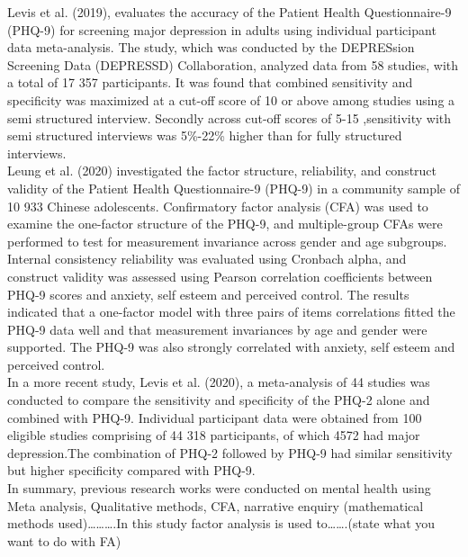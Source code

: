 \documentclass[12pt]{article}
\begin{document}
\noindent Levis et al. (2019), evaluates the accuracy of the Patient Health Questionnaire-9 (PHQ-9) for screening major depression in adults using individual participant data meta-analysis. The study, which was conducted by the DEPRESsion Screening Data (DEPRESSD) Collaboration, analyzed data from 58 studies, with a total of 17 357 participants. It was found that combined sensitivity and specificity was maximized at a cut-off score of 10 or above among studies using a semi structured interview. Secondly across cut-off scores of 5-15 ,sensitivity with semi structured interviews was 5\%-22\% higher than for fully structured interviews.\\

\noindent Leung et al. (2020) investigated the factor structure, reliability, and construct validity of the Patient Health Questionnaire-9 (PHQ-9) in a community sample of 10 933 Chinese adolescents. Confirmatory factor analysis (CFA) was used to examine the one-factor structure of the PHQ-9, and multiple-group CFAs were performed to test for measurement invariance across gender and age subgroups. Internal consistency reliability was evaluated using Cronbach alpha, and construct validity was assessed using Pearson correlation coefficients between PHQ-9 scores and anxiety, self esteem and perceived control. The results indicated that a one-factor model with three pairs of items correlations fitted the PHQ-9 data well and that measurement invariances by age and gender were supported. The PHQ-9 was also strongly correlated with anxiety, self esteem and perceived control.\\

\noindent In a more recent study, Levis et al. (2020), a meta-analysis of 44 studies was conducted to compare the sensitivity and specificity of the PHQ-2 alone and combined with PHQ-9. Individual participant data were obtained from 100 eligible studies comprising of 44 318 participants, of which 4572 had major depression.The combination of PHQ-2 followed by PHQ-9 had similar sensitivity but higher specificity compared with PHQ-9.\\

\noindent In summary, previous research works were conducted on mental health using Meta analysis, Qualitative methods, CFA, narrative enquiry (mathematical methods used)……….In this study factor analysis is used to…….(state what you want to do with FA)\\
\end{document}

